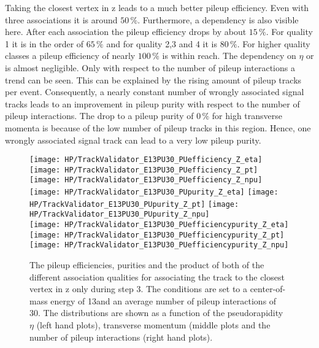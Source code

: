 Taking the closest vertex in z leads to a much better pileup efficiency. Even with three associations it is around $50\,\%$. Furthermore, a dependency is also visible here. After each association the pileup efficiency drops by about $15\,\%$. For quality 1 it is in the order of $65\,\%$ and for quality 2,3 and 4 it is $80\,\%$. For higher quality classes a pileup efficiency of nearly $100\,\%$ is within reach.  The dependency on $\eta$ or \pt{} is almost negligible. Only with respect to the number of pileup interactions a trend can be seen. This can be explained by the rising amount of pileup tracks per event. Consequently, a nearly constant number of wrongly associated signal tracks leads to an improvement in  pileup purity with respect to the number of pileup interactions. The drop to a pileup purity of $0\,\%$ for high transverse momenta is because of the low number of pileup tracks in this region. Hence, one wrongly associated signal track can lead to a very low pileup purity.

\begin{figure}[h!t]
  \centering
  \texttt{[image: HP/TrackValidator\_E13PU30\_PUefficiency\_Z\_eta]}
  \texttt{[image: HP/TrackValidator\_E13PU30\_PUefficiency\_Z\_pt]}
  \texttt{[image: HP/TrackValidator\_E13PU30\_PUefficiency\_Z\_npu]}
   \\
  \texttt{[image: HP/TrackValidator\_E13PU30\_PUpurity\_Z\_eta]}
  \texttt{[image: HP/TrackValidator\_E13PU30\_PUpurity\_Z\_pt]}
  \texttt{[image: HP/TrackValidator\_E13PU30\_PUpurity\_Z\_npu]}
   \\
  \texttt{[image: HP/TrackValidator\_E13PU30\_PUefficiencypurity\_Z\_eta]}
  \texttt{[image: HP/TrackValidator\_E13PU30\_PUefficiencypurity\_Z\_pt]}
  \texttt{[image: HP/TrackValidator\_E13PU30\_PUefficiencypurity\_Z\_npu]}
  \caption[Pileup efficiencies, purities and their product of the different qualities of the association map with associating to the closest vertex in z only during step 3 with 13\TeV and PU=30]{The pileup efficiencies, purities and the product of both of the different association qualities for associating the track to the closest vertex in z only during step 3. The conditions are set to a center-of-mass energy of 13\TeV and an average number of pileup interactions of 30. The distributions are shown as a function of the pseudorapidity $\eta$ (left hand plots), transverse momentum (middle plots and the number of pileup interactions (right hand plots). \label{plot:HPUTAE13PU30ZtomumuQualPUZ}}
\end{figure}

